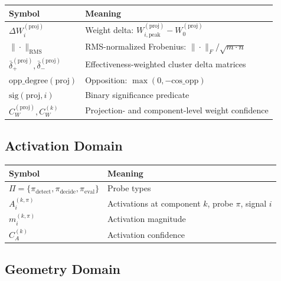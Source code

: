 \documentclass[11pt]{article}
\begin{document}
\begin{center}
\begin{tabular}{lp{}}
\toprule
\textbf{Symbol} & \textbf{Meaning} \\
\midrule
$\Delta W_i^{(\text{proj})}$ & Weight delta: $W_{i,\text{peak}}^{(\text{proj})} - W_0^{(\text{proj})}$ \\
$\|\cdot\|_{\text{RMS}}$ & RMS-normalized Frobenius: $\|\cdot\|_F / \sqrt{m \cdot n}$ \\
$\bar{\delta}^{(\text{proj})}_+, \bar{\delta}^{(\text{proj})}_-$ & Effectiveness-weighted cluster delta matrices \\
$\text{opp\_degree}(\text{proj})$ & Opposition: $\max(0, -\text{cos\_opp})$ \\
$\text{sig}(\text{proj},i)$ & Binary significance predicate \\
$C^{(\text{proj})}_W, C^{(k)}_W$ & Projection- and component-level weight confidence \\
\bottomrule
\end{tabular}
\end{center}

\subsection{Activation Domain}

\begin{center}
\begin{tabular}{ll}
\toprule
\textbf{Symbol} & \textbf{Meaning} \\
\midrule
$\Pi = \{\pi_{\text{detect}}, \pi_{\text{decide}}, \pi_{\text{eval}}\}$ & Probe types \\
$A^{(k,\pi)}_i$ & Activations at component $k$, probe $\pi$, signal $i$ \\
$m^{(k,\pi)}_i$ & Activation magnitude \\
$C^{(k)}_A$ & Activation confidence \\
\bottomrule
\end{tabular}
\end{center}

\subsection{Geometry Domain}
\end{document}
